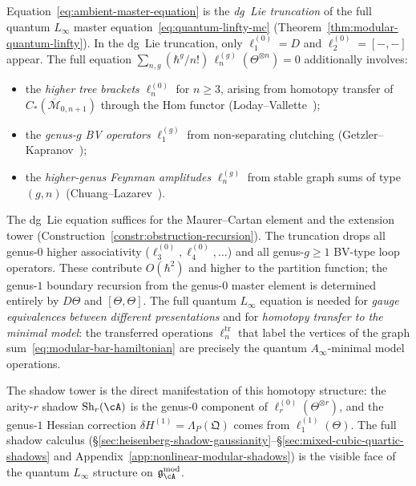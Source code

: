 \begin{remark}
\label{rem:dg-to-quantum-linfty}
Equation~\eqref{eq:ambient-master-equation} is the
\emph{dg~Lie truncation} of the full quantum $L_\infty$ master
equation~\eqref{eq:quantum-linfty-mc}
(Theorem~\ref{thm:modular-quantum-linfty}).  In the dg~Lie
truncation, only $\ell_1^{(0)} = D$ and $\ell_2^{(0)} = [-,-]$
appear.  The full equation
$\sum_{n,g} (\hbar^g/n!)\,\ell_n^{(g)}(\Theta^{\otimes n}) = 0$
additionally involves:
\begin{itemize}
\item the \emph{higher tree brackets} $\ell_n^{(0)}$ for $n \geq 3$,
arising from homotopy transfer of
$C_*(\overline{\mathcal{M}}_{0,n+1})$ through the Hom functor
(Loday--Vallette~\cite[Theorem~10.3.8]{LV12});
\item the \emph{genus-$g$ BV operators} $\ell_1^{(g)}$ from
non-separating clutching
(Getzler--Kapranov~\cite[\S5]{GeK98});
\item the \emph{higher-genus Feynman amplitudes} $\ell_n^{(g)}$
from stable graph sums of type $(g,n)$
(Chuang--Lazarev~\cite{CL10}).
\end{itemize}
The dg~Lie equation suffices for the Maurer--Cartan element and the
extension tower (Construction~\ref{constr:obstruction-recursion}).
The truncation drops all genus-$0$ higher associativity
($\ell_3^{(0)}, \ell_4^{(0)}, \ldots$) and all genus-$g \geq 1$
BV-type loop operators.  These contribute
$O(\hbar^2)$ and higher to the partition function; the genus-$1$
boundary recursion from the genus-$0$ master element is determined
entirely by $D\Theta$ and $[\Theta,\Theta]$.
The full quantum $L_\infty$ equation is needed for
\emph{gauge equivalences between different presentations} and for
\emph{homotopy transfer to the minimal model}: the transferred
operations $\ell_n^{\mathrm{tr}}$ that label the vertices of the
graph sum~\eqref{eq:modular-bar-hamiltonian} are precisely the
quantum $A_\infty$-minimal model operations.

The shadow tower is the direct manifestation of this homotopy
structure: the arity-$r$ shadow $\operatorname{Sh}_r(\cA)$ is
the genus-$0$ component of $\ell_r^{(0)}(\Theta^{\otimes r})$,
and the genus-$1$ Hessian correction
$\delta H^{(1)} = \Lambda_P(\mathfrak{Q})$ comes from
$\ell_1^{(1)}(\Theta)$.  The full shadow calculus
(\S\ref{sec:heisenberg-shadow-gaussianity}--\S\ref{sec:mixed-cubic-quartic-shadows}
and Appendix~\ref{app:nonlinear-modular-shadows}) is the
visible face of the quantum $L_\infty$
structure on $\mathfrak{g}_{\cA}^{\mathrm{mod}}$.
\end{remark}

